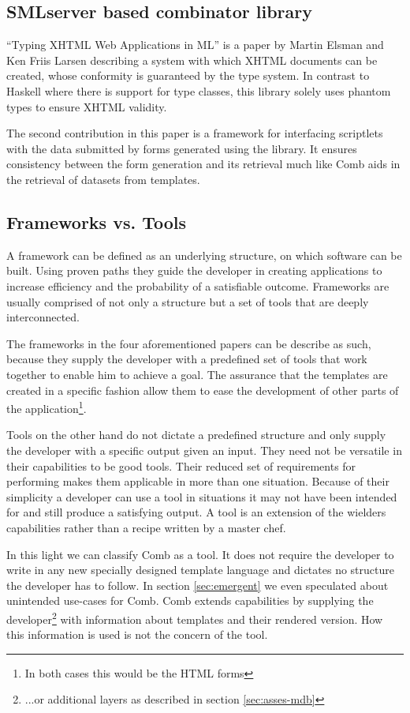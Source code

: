 \documentclass[thesis.tex]{subfiles}
\begin{document}
\subsection{SMLserver based combinator library}
``Typing XHTML Web Applications in ML''\cite{ML} is a paper by Martin Elsman and
Ken Friis Larsen describing a system with which XHTML documents can be created,
whose conformity is guaranteed by the type system. In contrast to Haskell where
there is support for type classes, this library solely uses phantom types to
ensure XHTML validity.

The second contribution in this paper is a framework for interfacing scriptlets
with the data submitted by forms generated using the library.
It ensures consistency between the form generation and its retrieval much like
Comb aids in the retrieval of datasets from templates.



\subsection{Frameworks vs. Tools}
A framework can be defined as an underlying structure, on which software can be
built. Using proven paths they guide the developer in creating applications to
increase efficiency and the probability of a satisfiable outcome.
Frameworks are usually comprised of not only a structure but a set of tools that
are deeply interconnected.

The frameworks in the four aforementioned papers can be describe as such,
because they supply the developer with a predefined set of tools that work
together to enable him to achieve a goal.
The assurance that the templates are created in a specific fashion allow them
to ease the development of other parts of the
application\footnote{In both cases this would be the HTML forms}.

Tools on the other hand do not dictate a predefined structure and only supply
the developer with a specific output given an input. They need not be versatile
in their capabilities to be good tools. Their reduced set of requirements for
performing makes them applicable in more than one situation. Because of their
simplicity a developer can use a tool in situations it may not have been
intended for and still produce a satisfying output. A tool is an extension of
the wielders capabilities rather than a recipe written by a master chef.

In this light we can classify Comb as a tool. It does not require the developer
to write in any new specially designed template language and dictates no
structure the developer has to follow. In section \ref{sec:emergent} we even
speculated about unintended use-cases for Comb. Comb extends capabilities by
supplying the developer\footnote{...or additional layers as described in
section \ref{sec:asses-mdb}} with information about templates and their
rendered version. How this information is used is not the concern of the tool.
\end{document}
